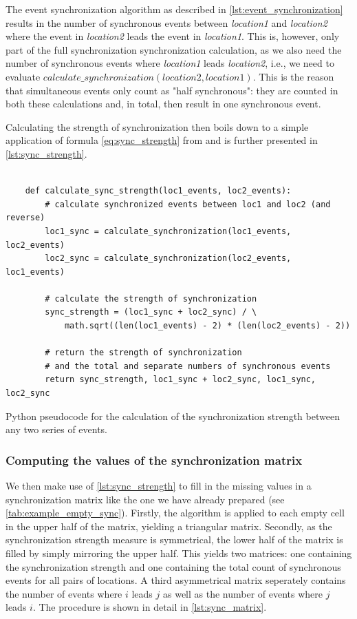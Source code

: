 The event synchronization algorithm as described in \cref{lst:event_synchronization} results in the number of synchronous events between \textit{location1} and \textit{location2} where the event in \textit{location2} leads the event in \textit{location1}. This is, however, only part of the full synchronization synchronization calculation, as we also need the number of synchronous events where \textit{location1} leads \textit{location2}, i.e., we need to evaluate $calculate\_synchronization(location2, location1)$. This is the reason that simultaneous events only count as "half synchronous": they are counted in both these calculations and, in total, then result in one synchronous event.

Calculating the strength of synchronization then boils down to a simple application of formula \eqref{eq:sync_strength} from \pageref{eq:sync_strength} and is further presented in \cref{lst:sync_strength}.

\begin{listing}[H]
  \begin{verbatim}

    def calculate_sync_strength(loc1_events, loc2_events):
        # calculate synchronized events between loc1 and loc2 (and reverse)
        loc1_sync = calculate_synchronization(loc1_events, loc2_events)
        loc2_sync = calculate_synchronization(loc2_events, loc1_events)

        # calculate the strength of synchronization
        sync_strength = (loc1_sync + loc2_sync) / \
            math.sqrt((len(loc1_events) - 2) * (len(loc2_events) - 2))

        # return the strength of synchronization
        # and the total and separate numbers of synchronous events
        return sync_strength, loc1_sync + loc2_sync, loc1_sync, loc2_sync

  \end{verbatim}
  \caption{Python pseudocode for the calculation of the synchronization strength between any two series of events.}
  \label{lst:sync_strength}
\end{listing}

\subsubsection{Computing the values of the synchronization matrix}
We then make use of \cref{lst:sync_strength} to fill in the missing values in a synchronization matrix like the one we have already prepared (see \cref{tab:example_empty_sync}). Firstly, the algorithm is applied to each empty cell in the upper half of the matrix, yielding a triangular matrix. Secondly, as the synchronization strength measure is symmetrical, the lower half of the matrix is filled by simply mirroring the upper half. This yields two matrices: one containing the synchronization strength and one containing the total count of synchronous events for all pairs of locations. A third asymmetrical matrix seperately contains the number of events where $i$ leads $j$ as well as the number of events where $j$ leads $i$. The procedure is shown in detail in \cref{lst:sync_matrix}.

